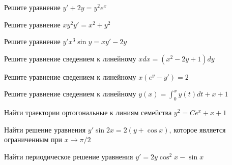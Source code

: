 \begin{task}
Решите уравнение $y'+2y=y^2e^x$
\end{task}

\begin{task}
Решите уравнение $xy^2y'=x^2+y^2$
\end{task}

\begin{task}
Решите уравнение $y'x^3\sin y = xy'-2y$
\end{task}

\begin{task}
Решите уравнение сведением к линейному $xdx=(x^2-2y+1)dy$
\end{task}

\begin{task}
Решите уравнение сведением к линейному $x(e^y-y')=2$
\end{task}

\begin{task}
Решите уравнение сведением к линейному $y(x)=\int_0^xy(t)dt+x+1$
\end{task}

\begin{task}
Найти траектории ортогональные к линиям семейства $y^2=Ce^x+x+1$
\end{task}

\begin{task}
Найти решение уравнения $y'\sin2x=2(y+\cos x)$, которое является ограниченным при $x \to \pi/2$
\end{task}

\begin{task}
Найти периодическое решение уравнения $y'=2y\cos^2 x-\sin x$
\end{task}
